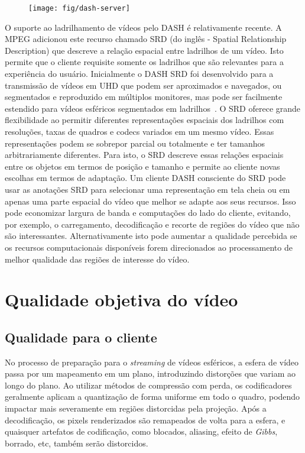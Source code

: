 \begin{figure}[h]
    \centering
    \texttt{[image: fig/dash-server]}
    \caption{}
    \label{fig:dash-server}
\end{figure}

O suporte ao ladrilhamento de vídeos pelo DASH é relativamente recente. A MPEG adicionou este recurso chamado SRD (do inglês - Spatial Relationship Description) que descreve a relação espacial entre ladrilhos de um vídeo. Isto permite que o cliente requisite somente os ladrilhos que são relevantes para a experiência do usuário. Inicialmente o DASH SRD foi desenvolvido para a transmissão de vídeos em UHD que podem ser aproximados e navegados, ou segmentados e reproduzido em múltiplos monitores, mas pode ser facilmente estendido para vídeos esféricos segmentados em ladrilhos~\cite{Niamut2016}. O SRD oferece grande flexibilidade ao permitir diferentes representações espaciais dos ladrilhos com resoluções, taxas de quadros e codecs variados em um mesmo vídeo. Essas representações podem se sobrepor parcial ou totalmente e ter tamanhos arbitrariamente diferentes. Para isto, o SRD descreve essas relações espaciais entre os objetos em termos de posição e tamanho e permite ao cliente novas escolhas em termos de adaptação. Um cliente DASH consciente do SRD pode usar as anotações SRD para selecionar uma representação em tela cheia ou em apenas uma parte espacial do vídeo que melhor se adapte aos seus recursos. Isso pode economizar largura de banda e computações do lado do cliente, evitando, por exemplo, o carregamento, decodificação e recorte de regiões do vídeo que não são interessantes. Alternativamente isto pode aumentar a qualidade percebida se os recursos computacionais disponíveis forem direcionados ao processamento de melhor qualidade das regiões de interesse do vídeo.



\section{Qualidade objetiva do vídeo}

\subsection{Qualidade para o cliente}

No processo de preparação para o \textit{streaming} de vídeos esféricos, a esfera de vídeo passa por um mapeamento em um plano, introduzindo distorções que variam ao longo do plano. Ao utilizar métodos de compressão com perda, os codificadores geralmente aplicam a quantização de forma uniforme em todo o quadro, podendo impactar mais severamente em regiões distorcidas pela projeção. Após a decodificação, os pixels renderizados são remapeados de volta para a esfera, e quaisquer artefatos de codificação, como blocados, aliasing, efeito de \textit{Gibbs}, borrado, etc, também serão distorcidos.

